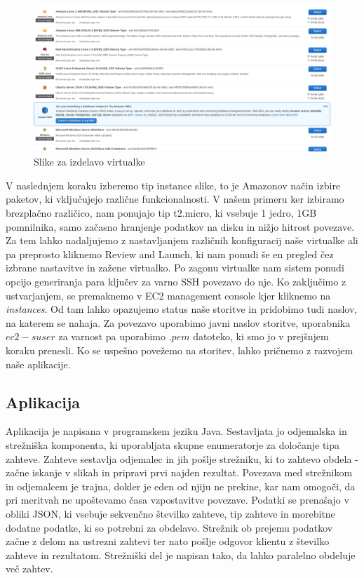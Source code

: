 \begin{figure}[H]
    \centering
    \includegraphics[scale=0.25]{Img/1_AWS_images.png}
    \caption{Slike za izdelavo virtualke}
    \label{fig:1_AWS_images}
\end{figure}

V naslednjem koraku izberemo tip instance slike, to je Amazonov način izbire paketov, ki vključujejo različne funkcionalnosti. V našem primeru ker izbiramo brezplačno različico, nam ponujajo tip t2.micro, ki vsebuje 1 jedro, 1GB pomnilnika, samo začasno hranjenje podatkov na disku in nižjo hitrost povezave. Za tem lahko nadaljujemo z nastavljanjem različnih konfiguracij naše virtualke ali pa preprosto kliknemo Review and Launch, ki nam ponudi še en pregled čez izbrane nastavitve in zažene virtualko. Po zagonu virtualke nam sistem ponudi opcijo generiranja para ključev za varno SSH povezavo do nje. Ko zaključimo z ustvarjanjem, se premaknemo v EC2 management console kjer kliknemo na \emph{instances}. Od tam lahko opazujemo status naše storitve in pridobimo tudi naslov, na katerem se nahaja. Za povezavo uporabimo javni naslov storitve, uporabnika $ec2-suser$ za varnost pa uporabimo $.pem$ datoteko, ki smo jo v prejšnjem koraku prenesli. Ko se uspešno povežemo na storitev, lahko pričnemo z razvojem naše aplikacije.

\subsection{Aplikacija}
Aplikacija je napisana v programskem jeziku Java. Sestavljata jo odjemalska in strežniška komponenta, ki uporabljata skupne enumeratorje za določanje tipa zahteve. Zahteve sestavlja odjemalec in jih pošlje strežniku, ki to zahtevo obdela - začne iskanje v slikah in pripravi prvi najden rezultat. Povezava med strežnikom in odjemalcem je trajna, dokler je eden od njiju ne prekine, kar nam omogoči, da pri meritvah ne upoštevamo časa vzpostavitve povezave. Podatki se prenašajo v obliki JSON, ki vsebuje sekvenčno številko zahteve, tip zahteve in morebitne dodatne podatke, ki so potrebni za obdelavo. Strežnik ob prejemu podatkov začne z delom na ustrezni zahtevi ter nato pošlje odgovor klientu z številko zahteve in rezultatom. Strežniški del je napisan tako, da lahko paralelno obdeluje več zahtev.

